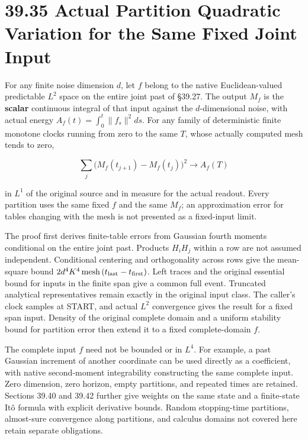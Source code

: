 \documentclass[
  english,
  11pt,
  oneside]{book}
\begin{document}
\section{39.35 Actual Partition Quadratic Variation for the Same Fixed Joint Input}\label{actual-partition-quadratic-variation-for-the-same-fixed-joint-input}

For any finite noise dimension \(d\), let \(f\) belong to the native Euclidean-valued predictable \(L^2\) space on the entire joint past of §39.27. The output \(M_f\) is the \textbf{scalar} continuous integral of that input against the \(d\)-dimensional noise, with actual energy \(A_f(t)=\int_0^t\|f_s\|^2ds\). For any family of deterministic finite monotone clocks running from zero to the same \(T\), whose actually computed mesh tends to zero,

\[\sum_j\bigl(M_f(t_{j+1})-M_f(t_j)\bigr)^2
\longrightarrow A_f(T)\]

in \(L^1\) of the original source and in measure for the actual readout. Every partition uses the same fixed \(f\) and the same \(M_f\); an approximation error for tables changing with the mesh is not presented as a fixed-input limit.

The proof first derives finite-table errors from Gaussian fourth moments conditional on the entire joint past. Products \(H_iH_j\) within a row are not assumed independent. Conditional centering and orthogonality across rows give the mean-square bound \(2d^4K^4\,\mathrm{mesh}\,(t_{\rm last}-t_{\rm first})\). Left traces and the original essential bound for inputs in the finite span give a common full event. Truncated analytical representatives remain exactly in the original input class. The caller's clock samples at START, and actual \(L^2\) convergence gives the result for a fixed span input. Density of the original complete domain and a uniform stability bound for partition error then extend it to a fixed complete-domain \(f\).

The complete input \(f\) need not be bounded or in \(L^4\). For example, a past Gaussian increment of another coordinate can be used directly as a coefficient, with native second-moment integrability constructing the same complete input. Zero dimension, zero horizon, empty partitions, and repeated times are retained. Sections 39.40 and 39.42 further give weights on the same state and a finite-state Itô formula with explicit derivative bounds. Random stopping-time partitions, almost-sure convergence along partitions, and calculus domains not covered here retain separate obligations.
\end{document}
